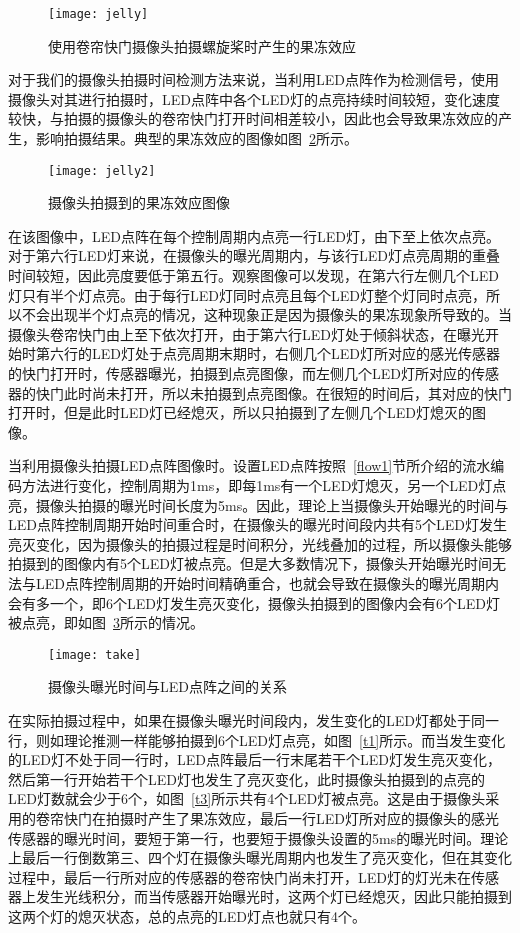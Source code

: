 \begin{figure}[h] 
  \centering
  \texttt{[image: jelly]}
  \caption{使用卷帘快门摄像头拍摄螺旋桨时产生的果冻效应}
  \label{jelly}
\end{figure}

对于我们的摄像头拍摄时间检测方法来说，当利用LED点阵作为检测信号，使用摄像头对其进行拍摄时，LED点阵中各个LED灯的点亮持续时间较短，变化速度较快，与拍摄的摄像头的卷帘快门打开时间相差较小，因此也会导致果冻效应的产生，影响拍摄结果。典型的果冻效应的图像如图~\ref{jelly2}所示。

\begin{figure}[h] 
  \centering
  \texttt{[image: jelly2]}
  \caption{摄像头拍摄到的果冻效应图像}
  \label{jelly2}
\end{figure}

在该图像中，LED点阵在每个控制周期内点亮一行LED灯，由下至上依次点亮。对于第六行LED灯来说，在摄像头的曝光周期内，与该行LED灯点亮周期的重叠时间较短，因此亮度要低于第五行。观察图像可以发现，在第六行左侧几个LED灯只有半个灯点亮。由于每行LED灯同时点亮且每个LED灯整个灯同时点亮，所以不会出现半个灯点亮的情况，这种现象正是因为摄像头的果冻现象所导致的。当摄像头卷帘快门由上至下依次打开，由于第六行LED灯处于倾斜状态，在曝光开始时第六行的LED灯处于点亮周期末期时，右侧几个LED灯所对应的感光传感器的快门打开时，传感器曝光，拍摄到点亮图像，而左侧几个LED灯所对应的传感器的快门此时尚未打开，所以未拍摄到点亮图像。在很短的时间后，其对应的快门打开时，但是此时LED灯已经熄灭，所以只拍摄到了左侧几个LED灯熄灭的图像。

当利用摄像头拍摄LED点阵图像时。设置LED点阵按照~\ref{flow1}节所介绍的流水编码方法进行变化，控制周期为1ms，即每1ms有一个LED灯熄灭，另一个LED灯点亮，摄像头拍摄的曝光时间长度为5ms。因此，理论上当摄像头开始曝光的时间与LED点阵控制周期开始时间重合时，在摄像头的曝光时间段内共有5个LED灯发生亮灭变化，因为摄像头的拍摄过程是时间积分，光线叠加的过程，所以摄像头能够拍摄到的图像内有5个LED灯被点亮。但是大多数情况下，摄像头开始曝光时间无法与LED点阵控制周期的开始时间精确重合，也就会导致在摄像头的曝光周期内会有多一个，即6个LED灯发生亮灭变化，摄像头拍摄到的图像内会有6个LED灯被点亮，即如图~\ref{take}所示的情况。

\begin{figure}[h] 
  \centering
  \texttt{[image: take]}
  \caption{摄像头曝光时间与LED点阵之间的关系}
  \label{take}
\end{figure}

在实际拍摄过程中，如果在摄像头曝光时间段内，发生变化的LED灯都处于同一行，则如理论推测一样能够拍摄到6个LED灯点亮，如图~\ref{t1}所示。而当发生变化的LED灯不处于同一行时，LED点阵最后一行末尾若干个LED灯发生亮灭变化，然后第一行开始若干个LED灯也发生了亮灭变化，此时摄像头拍摄到的点亮的LED灯数就会少于6个，如图~\ref{t3}所示共有4个LED灯被点亮。这是由于摄像头采用的卷帘快门在拍摄时产生了果冻效应，最后一行LED灯所对应的摄像头的感光传感器的曝光时间，要短于第一行，也要短于摄像头设置的5ms的曝光时间。理论上最后一行倒数第三、四个灯在摄像头曝光周期内也发生了亮灭变化，但在其变化过程中，最后一行所对应的传感器的卷帘快门尚未打开，LED灯的灯光未在传感器上发生光线积分，而当传感器开始曝光时，这两个灯已经熄灭，因此只能拍摄到这两个灯的熄灭状态，总的点亮的LED灯点也就只有4个。

